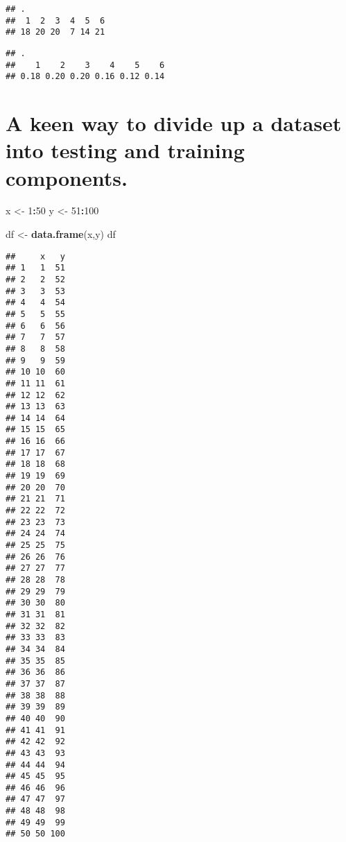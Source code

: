 \documentclass[]{book}
\newenvironment{Shaded}{\begin{snugshade}}{\end{snugshade}}
\newcommand{\DataTypeTok}[1]{\textcolor[rgb]{0.13,0.29,0.53}{#1}}
\newcommand{\DecValTok}[1]{\textcolor[rgb]{0.00,0.00,0.81}{#1}}
\newcommand{\KeywordTok}[1]{\textcolor[rgb]{0.13,0.29,0.53}{\textbf{#1}}}
\newcommand{\NormalTok}[1]{#1}
\newcommand{\OperatorTok}[1]{\textcolor[rgb]{0.81,0.36,0.00}{\textbf{#1}}}
\newcommand{\OtherTok}[1]{\textcolor[rgb]{0.56,0.35,0.01}{#1}}
\newcommand{\StringTok}[1]{\textcolor[rgb]{0.31,0.60,0.02}{#1}}
\begin{document}
\begin{verbatim}
## .
##  1  2  3  4  5  6 
## 18 20 20  7 14 21
\end{verbatim}

\begin{Shaded}
\end{Shaded}

\begin{verbatim}
## .
##    1    2    3    4    5    6 
## 0.18 0.20 0.20 0.16 0.12 0.14
\end{verbatim}

\hypertarget{a-keen-way-to-divide-up-a-dataset-into-testing-and-training-components.}{%
\section{A keen way to divide up a dataset into testing and training components.}\label{a-keen-way-to-divide-up-a-dataset-into-testing-and-training-components.}}

\begin{Shaded}
\begin{Highlighting}[]
\NormalTok{x <-}\StringTok{ }\DecValTok{1}\OperatorTok{:}\DecValTok{50}
\NormalTok{y <-}\StringTok{ }\DecValTok{51}\OperatorTok{:}\DecValTok{100}

\NormalTok{df <-}\StringTok{ }\KeywordTok{data.frame}\NormalTok{(x,y)}
\NormalTok{df}
\end{Highlighting}
\end{Shaded}

\begin{verbatim}
##     x   y
## 1   1  51
## 2   2  52
## 3   3  53
## 4   4  54
## 5   5  55
## 6   6  56
## 7   7  57
## 8   8  58
## 9   9  59
## 10 10  60
## 11 11  61
## 12 12  62
## 13 13  63
## 14 14  64
## 15 15  65
## 16 16  66
## 17 17  67
## 18 18  68
## 19 19  69
## 20 20  70
## 21 21  71
## 22 22  72
## 23 23  73
## 24 24  74
## 25 25  75
## 26 26  76
## 27 27  77
## 28 28  78
## 29 29  79
## 30 30  80
## 31 31  81
## 32 32  82
## 33 33  83
## 34 34  84
## 35 35  85
## 36 36  86
## 37 37  87
## 38 38  88
## 39 39  89
## 40 40  90
## 41 41  91
## 42 42  92
## 43 43  93
## 44 44  94
## 45 45  95
## 46 46  96
## 47 47  97
## 48 48  98
## 49 49  99
## 50 50 100
\end{verbatim}
\end{document}
